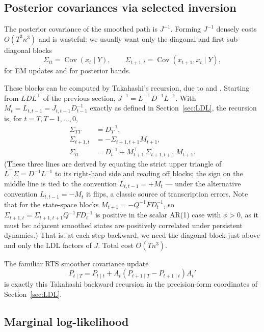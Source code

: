 \documentclass[11pt]{article}
\newcommand{\Cov}{\operatorname{Cov}}
\begin{document}
\subsection{Posterior covariances via selected inversion}
\label{sec:selinv}

The posterior covariance of the smoothed path is $J^{-1}$.  Forming
$J^{-1}$ densely costs $O(T^3n^3)$ and is wasteful: we usually want only
the diagonal and first sub-diagonal blocks
\begin{equation}
\Sigma_{tt}=\Cov(x_t\mid Y),
\qquad
\Sigma_{t+1,t}=\Cov(x_{t+1},x_t\mid Y),
\end{equation}
for EM updates and for posterior bands.

These blocks can be computed by Takahashi's recursion, due to
\citet{TakahashiFaganChen1973} and \citet{ErismanTinney1975}.  Starting from $LDL^\top$
of the previous section, $J^{-1}=L^{-\top}D^{-1}L^{-1}$.  With
$M_t=L_{t,t-1}=J_{t,t-1}D_{t-1}^{-1}$ exactly as defined in
Section~\ref{sec:LDL}, the recursion is, for $t=T,T-1,\ldots,0$,
\begin{align}
\Sigma_{TT}&=D_T^{-1},\\
\Sigma_{t+1,t}&=-\Sigma_{t+1,t+1}M_{t+1},\\
\Sigma_{tt}&=D_t^{-1}+M_{t+1}^\top\,\Sigma_{t+1,t+1}\,M_{t+1}.
\end{align}
(These three lines are derived by equating the strict upper triangle
of $L^\top\Sigma=D^{-1}L^{-1}$ to its right-hand side and reading off
blocks; the sign on the middle line is tied to the convention
$L_{t,t-1}=+M_t$ --- under the alternative convention
$L_{t,t-1}=-M_t$ it flips, a classic source of transcription errors.
Note that for the state-space blocks $M_{t+1}=-Q^{-1}FD_t^{-1}$, so
$\Sigma_{t+1,t}=\Sigma_{t+1,t+1}Q^{-1}FD_t^{-1}$ is positive in the
scalar AR(1) case with $\phi>0$, as it must be: adjacent smoothed
states are positively correlated under persistent dynamics.)
That is: at each step backward, we need the diagonal block just above
and only the LDL factors of $J$.  Total cost $O(Tn^3)$.

The familiar RTS smoother covariance update
\begin{equation}
P_{t\mid T}=P_{t\mid t}+A_t(P_{t+1\mid T}-P_{t+1\mid t})A_t'
\end{equation}
is exactly this Takahashi backward recursion in the precision-form
coordinates of Section~\ref{sec:LDL}.

\subsection{Marginal log-likelihood}
\label{sec:marg-loglik}
\label{sec:loglik}
\end{document}

